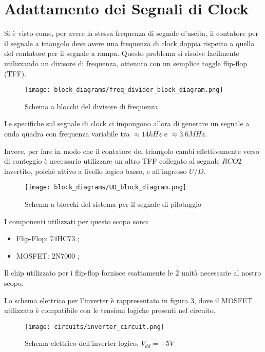\section{Adattamento dei Segnali di Clock}

Si è visto come, per avere la stessa frequenza di segnale d'uscita, il contatore per il segnale
a triangolo deve avere una frequenza di clock doppia rispetto a quella del contatore per il
segnale a rampa. Questo problema si risolve facilmente utilizzando un divisore di frequenza,
ottenuto con un semplice toggle flip-flop (TFF).
\medskip

\begin{figure}[ht]
    \centering
    \texttt{[image: block\_diagrams/freq\_divider\_block\_diagram.png]}
    \caption{Schema a blocchi del divisore di frequenza}
    \label{freq_divider_block_diagram}
\end{figure}

Le specifiche sul segnale di clock ci impongono allora di generare un segnale a onda quadra
con frequenza variabile tra $\approx14kHz$ e $\approx3.6MHz$.

Invece, per fare in modo che il contatore del triangolo cambi effettivamente verso di conteggio
è necessario utilizzare un altro TFF collegato al segnale $RCO2$ invertito, poichè attivo a
livello logico basso, e all'ingresso $U/D$.
\medskip

\begin{figure}[ht]
    \centering
    \texttt{[image: block\_diagrams/UD\_block\_diagram.png]}
    \caption{Schema a blocchi del sistema per il segnale di pilotaggio}
    \label{UD_block_diagram}
\end{figure}

I componenti utilizzati per questo scopo sono:

\begin{itemize}
    \item Flip-Flop: 74HC73 \cite{74hc73};
    \item MOSFET: 2N7000 \cite{2n7000};
\end{itemize}

Il chip utilizzato per i flip-flop fornisce esattamente le 2 unità necessarie al nostro scopo.

Lo schema elettrico per l'inverter è rappresentato in figura \ref{inverter_circuit}, dove il
MOSFET utilizzato è compatibile con le tensioni logiche presenti nel circuito.
\medskip

\begin{figure}[ht]
    \centering
    \texttt{[image: circuits/inverter\_circuit.png]}
    \caption{Schema elettrico dell'inverter logico, $V_{dd}=+5V$}
    \label{inverter_circuit}
\end{figure}

